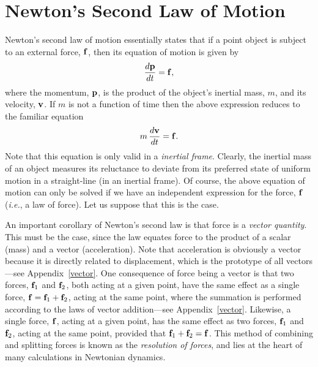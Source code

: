 \section{Newton's Second Law of Motion}\label{new2}
Newton's second law of motion essentially states that if a point object
is subject to an external force, ${\bf f}$, then its equation of motion
is given by
\begin{equation}\label{en2}
\frac{d{\bf p}}{dt} = {\bf f},
\end{equation}
where the momentum, ${\bf p}$, is the product of the  object's inertial
mass, $m$,   and its velocity, ${\bf v}$. If $m$
is not a function of time then the above expression reduces to the
familiar equation
\begin{equation}\label{e3.14}
m\,\frac{d{\bf v}}{dt} = {\bf f}.
\end{equation}
Note that this equation is only valid in a {\em inertial frame}. 
Clearly, the inertial mass of an object measures its reluctance to deviate
from its preferred state of uniform motion in a straight-line (in an
inertial frame). Of course, the above equation of motion can only be solved if we have an independent expression for the force, ${\bf f}$  ({\em i.e.}, a law of force).
Let us suppose that this is the case.

An important corollary of Newton's second law is that force is a {\em vector
quantity}. This must be the case, since the law  equates force to the
product of a scalar (mass) and a vector (acceleration). 
Note that acceleration is obviously a vector because it is directly related to displacement, which is the prototype of all vectors---see Appendix~\ref{vector}. One consequence of force being a vector is
that two forces, ${\bf f}_1$ and ${\bf f}_2$, both acting at a given
point, have the same effect as a single force, ${\bf f} = {\bf f}_1+{\bf f}_2$,
acting at the same point, where the summation is performed according to the
laws of vector addition---see Appendix~\ref{vector}. Likewise, a single force, ${\bf f}$, acting at
a given point, has the same effect as two forces, ${\bf f}_1$ and ${\bf f}_2$,
acting at the same point, provided that ${\bf f}_1+{\bf f}_2={\bf f}$. This
method of combining and splitting forces is known as the {\em resolution of
forces}, and lies at the heart of many calculations in Newtonian dynamics.

